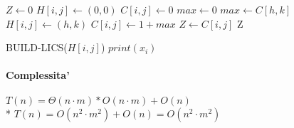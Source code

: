 \begin{algorithm}
    \begin{algorithmic}
            \State $Z \gets 0$
                    \State $H[i,j] \gets (0,0)$
                        \State $C[i,j] \gets 0$
                    \Else
                        \State $max \gets 0$
                                    \State $max \gets C[h,k]$
                                    \State $H[i,j] \gets (h,k)$
                                \EndIf
                            \EndFor
                        \EndFor
                        \State $C[i,j] \gets 1 + max$
                            \State $Z \gets C[i,j]$
                        \EndIf
                    \EndIf
                \EndFor
            \EndFor
            \State \Return Z
        \EndProcedure
    \end{algorithmic}
\end{algorithm}

\begin{algorithm}
    \begin{algorithmic}
                \State BUILD-LICS($H[i,j]$)
            \EndIf
            \State $print(x_i)$
        \EndProcedure
    \end{algorithmic}
\end{algorithm}

\paragraph{Complessita'}
$T(n) = \Theta(n \cdot m) * O(n \cdot m) + O(n)$ \\*
$T(n) = O(n^2 \cdot m^2) + O(n) = O(n^2 \cdot m^2)$